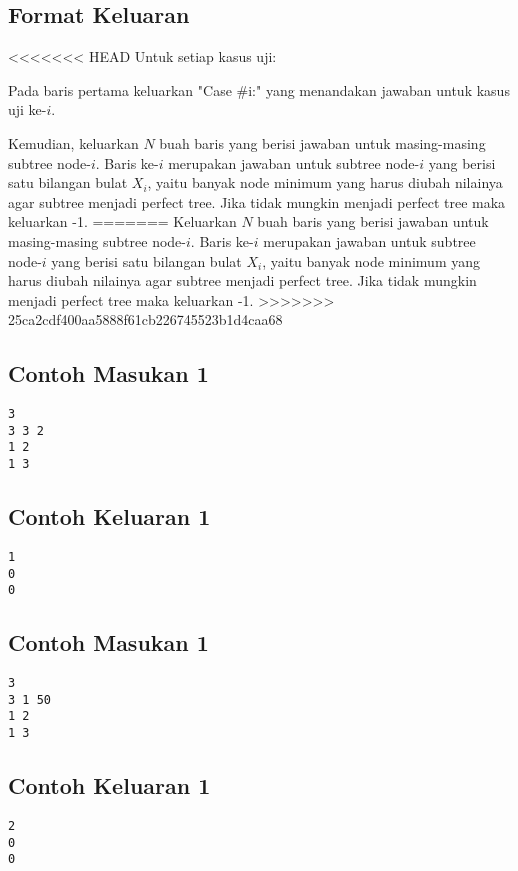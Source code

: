 \documentclass{article}
\begin{document}
\subsection*{Format Keluaran}

<<<<<<< HEAD
Untuk setiap kasus uji:

Pada baris pertama keluarkan "Case \#i:" yang menandakan jawaban untuk kasus uji ke-$i$. 

Kemudian, keluarkan $N$ buah baris yang berisi jawaban untuk masing-masing subtree node-$i$. Baris ke-$i$ merupakan jawaban untuk subtree node-$i$ yang berisi satu bilangan bulat $X_i$, yaitu banyak node minimum yang harus diubah nilainya agar subtree menjadi perfect tree. Jika tidak mungkin menjadi perfect tree maka keluarkan -1.
=======
Keluarkan $N$ buah baris yang berisi jawaban untuk masing-masing subtree node-$i$. Baris ke-$i$ merupakan jawaban untuk subtree node-$i$ yang berisi satu bilangan bulat $X_i$, yaitu banyak node minimum yang harus diubah nilainya agar subtree menjadi perfect tree. Jika tidak mungkin menjadi perfect tree maka keluarkan -1.
>>>>>>> 25ca2cdf400aa5888f61cb226745523b1d4caa68
\\

\begin{multicols}{2}
\subsection*{Contoh Masukan 1}
\begin{lstlisting}
3
3 3 2
1 2
1 3

\end{lstlisting}
\columnbreak
\subsection*{Contoh Keluaran 1}
\begin{lstlisting}
1
0
0
\end{lstlisting}
\vfill
\null
\end{multicols}

\begin{multicols}{2}
\subsection*{Contoh Masukan 1}
\begin{lstlisting}
3
3 1 50
1 2
1 3

\end{lstlisting}
\columnbreak
\subsection*{Contoh Keluaran 1}
\begin{lstlisting}
2
0
0
\end{lstlisting}
\vfill
\null
\end{multicols}


\pagebreak
\end{document}
